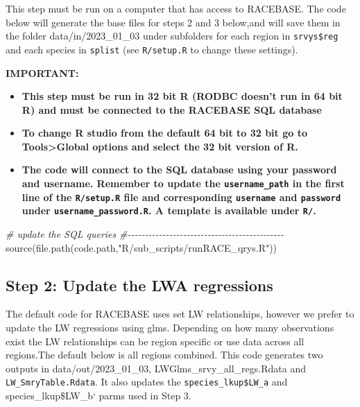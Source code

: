 \documentclass[
]{article}
\newenvironment{Shaded}{\begin{snugshade}}{\end{snugshade}}
\newcommand{\CommentTok}[1]{\textcolor[rgb]{0.56,0.35,0.01}{\textit{#1}}}
\newcommand{\FunctionTok}[1]{\textcolor[rgb]{0.00,0.00,0.00}{#1}}
\newcommand{\NormalTok}[1]{#1}
\newcommand{\StringTok}[1]{\textcolor[rgb]{0.31,0.60,0.02}{#1}}
\begin{document}
This step must be run on a computer that has access to RACEBASE. The
code below will generate the base files for steps 2 and 3 below,and will
save them in the folder data/in/2023\_01\_03 under subfolders for each
region in \texttt{srvys\$reg} and each species in \texttt{splist} (see
\texttt{R/setup.R} to change these settings).

\textbf{IMPORTANT:}

\begin{itemize}
\item
  \textbf{This step must be run in 32 bit R (RODBC doesn't run in 64 bit
  R) and must be connected to the RACEBASE SQL database}
\item
  \textbf{To change R studio from the default 64 bit to 32 bit go to
  Tools\textgreater Global options and select the 32 bit version of R.}
\item
  \textbf{The code will connect to the SQL database using your password
  and username. Remember to update the \texttt{username\_path} in the
  first line of the \texttt{R/setup.R} file and corresponding
  \texttt{username} and \texttt{password} under
  \texttt{username\_password.R}. A template is available under
  \texttt{R/}.}
\end{itemize}

\begin{Shaded}
\begin{Highlighting}[]
  \CommentTok{\# update the SQL queries}
  \CommentTok{\#{-}{-}{-}{-}{-}{-}{-}{-}{-}{-}{-}{-}{-}{-}{-}{-}{-}{-}{-}{-}{-}{-}{-}{-}{-}{-}{-}{-}{-}{-}{-}{-}{-}{-}{-}{-}{-}{-}{-}{-}{-}{-}{-}{-}{-}  }
  \FunctionTok{source}\NormalTok{(}\FunctionTok{file.path}\NormalTok{(code.path,}\StringTok{"R/sub\_scripts/runRACE\_qrys.R"}\NormalTok{))}
\end{Highlighting}
\end{Shaded}

\hypertarget{step-2-update-the-lwa-regressions}{%
\subsection{Step 2: Update the LWA
regressions}\label{step-2-update-the-lwa-regressions}}

The default code for RACEBASE uses set LW relationships, however we
prefer to update the LW regressions using glms. Depending on how many
observations exist the LW relationships can be region specific or use
data across all regions.The default below is all regions combined. This
code generates two outputs in data/out/2023\_01\_03,
LWGlms\_srvy\_all\_regs.Rdata and \texttt{LW\_SmryTable.Rdata}. It also
updates the \texttt{species\_lkup\$LW\_a} and species\_lkup\$LW\_b`
parms used in Step 3.
\end{document}
